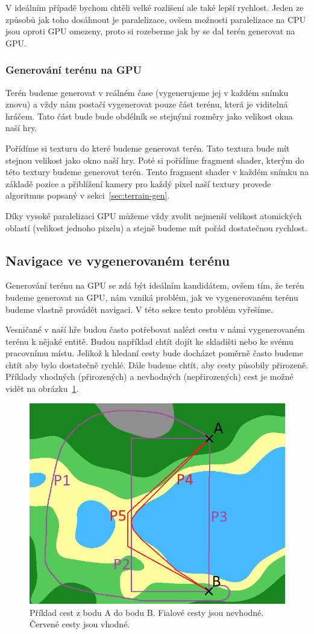 V ideálním případě bychom chtěli velké rozlišení ale také lepší rychlost. Jeden ze způsobů jak toho dosáhnout je paralelizace, ovšem možnosti paralelizace na CPU jsou oproti GPU omezeny, proto si rozeberme jak by se dal terén generovat na GPU.

\subsubsection{Generování terénu na GPU}
Terén budeme generovat v reálném čase (vygenerujeme jej v každém snímku znovu) a vždy nám postačí vygenerovat pouze část terénu, která je viditelná hráčem. Tato část bude bude obdélník se stejnými rozměry jako velikost okna naší hry.

Pořídíme si texturu do které budeme generovat terén. Tato textura bude mít stejnou velikost jako okno naší hry. Poté si pořídíme fragment shader, kterým do této textury budeme generovat terén. Tento fragment shader v každém snímku na základě pozice a přiblížení kamery pro každý pixel naší textury provede algoritmus popsaný v sekci~\ref{sec:terrain-gen}.

Díky vysoké paralelizaci GPU můžeme vždy zvolit nejmenší velikost atomických oblastí (velikost jednoho pixelu) a stejně budeme mít pořád dostatečnou rychlost.

\subsection{Navigace ve vygenerovaném terénu}
Generování terénu na GPU se zdá být ideálním kandidátem, ovšem tím, že terén budeme generovat na GPU, nám vzniká problém, jak ve vygenerovaném terénu budeme vlastně provádět navigaci. V této sekce tento problém vyřešíme.

Vesničané v naší hře budou často potřebovat nalézt cestu v námi vygenerovaném terénu k nějaké entitě. Budou například chtít dojít ke skladišti nebo ke svému pracovnímu místu. Jelikož k hledaní cesty bude docházet poměrně často budeme chtít aby bylo dostatečně rychlé. Dále budeme chtít, aby cesty působily přirozeně. Příklady vhodných (přirozených) a nevhodných (nepřirozených) cest je možné vidět na obrázku~\ref{fig:path}.

\begin{figure}[!htb]
    \centering
    \includegraphics[width=0.66\linewidth]{img/path.png}
    \caption{Příklad cest z bodu A do bodu B. Fialové cesty jsou nevhodné. Červené cesty jsou vhodné.}
    \label{fig:path}
\end{figure}

